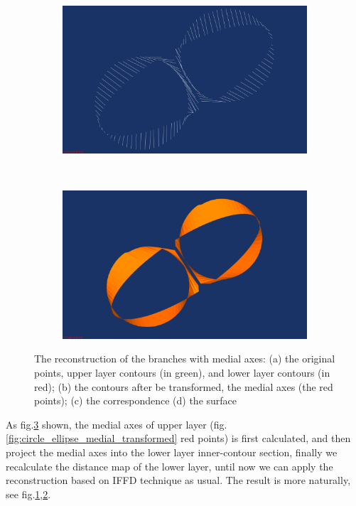 \documentclass[3p,times]{elsarticle}
\begin{document}
\begin{figure}[ht]
\begin{subfigure}[b]{0.4\textwidth}
\includegraphics[width=\textwidth]{../picture/circle_ellipse_medial_correspondence.png}
\caption{}
\label{fig:circle_ellipse_medial_correspondence}
\end{subfigure}
~~~~~~~~~~~~~~~~~~~~~~~~~~~~~~~~~~~~
\begin{subfigure}[b]{0.4\textwidth}
\includegraphics[width=\textwidth]{../picture/circle_ellipse_medial_surface.png}
\caption{}
\label{fig:circle_ellipse_medial_surface}
\end{subfigure}
\caption{The reconstruction of the branches with medial axes: (a) the original points,
  upper layer contours (in green), and lower layer contours (in red); (b)
  the contours after be transformed, the medial axes (the red points); (c) the correspondence (d) the
  surface}
\label{fig:branches with medial axes}
\end{figure}

As fig.\ref{fig:branches with medial axes} shown, the medial axes of
upper layer  (fig.\ref{fig:circle_ellipse_medial_transformed} red
points) is first calculated, and then project the medial axes into the
lower layer inner-contour section, finally we recalculate the distance
map of the lower layer, until now we can apply the reconstruction
based on IFFD technique as usual. The result is more naturally, see
fig.\ref{fig:circle_ellipse_medial_correspondence},\ref{fig:circle_ellipse_medial_surface}.
\end{document}
